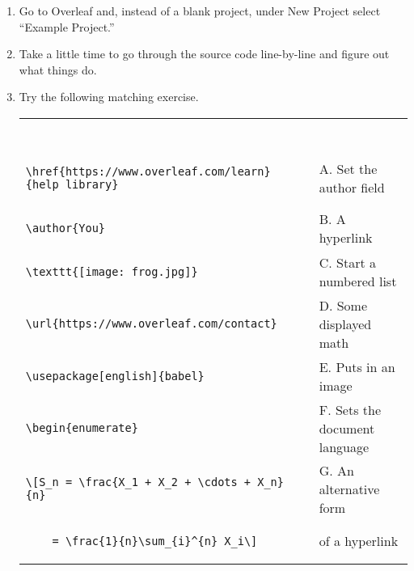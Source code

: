 \begin{enumerate}
	\item Go to Overleaf and, instead of a blank project, under New Project select ``Example Project.''

  \item Take a little time to go through the source code line-by-line and figure out what things do.

  \item Try the following matching exercise.

 \hspace{-.75in} \begin{tabular}{lcl} 
 & \rule{48pt}{0pt} & \\
\rule[-18pt]{0pt}{48pt} \begin{small}\verb+\href{https://www.overleaf.com/learn}{help library}+ \end{small} & & A. Set the author field \\
\rule[-18pt]{0pt}{48pt} \begin{small}\verb+\author{You}+ \end{small} & & B. A hyperlink\\
\rule[-18pt]{0pt}{48pt} \begin{small}\verb+\texttt{[image: frog.jpg]}+ \end{small} & & C. Start a numbered list\\
\rule[-18pt]{0pt}{48pt} \begin{small}\verb+\url{https://www.overleaf.com/contact}+  \end{small} & & D. Some displayed math\\
\rule[-18pt]{0pt}{48pt} \begin{small}\verb+\usepackage[english]{babel}+ \end{small} & & E. Puts in an image\\
\rule[-18pt]{0pt}{48pt} \begin{small}\verb-\begin{enumerate}- \end{small} & & F. Sets the document language\\
\rule[0pt]{0pt}{30pt}   \begin{small}\verb-\[S_n = \frac{X_1 + X_2 + \cdots + X_n}{n}- \end{small} & & G. An alternative form\\
\rule[-18pt]{0pt}{30pt} \begin{small}\verb+    = \frac{1}{n}\sum_{i}^{n} X_i\]+ \end{small} & & \hspace{.2in} of a hyperlink\\
\end{tabular}


\end{enumerate}

